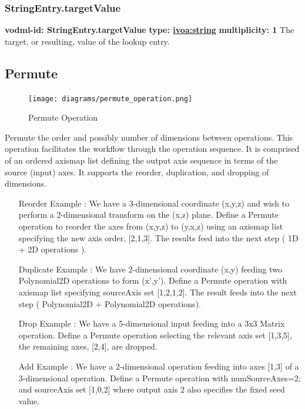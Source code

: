     \subsubsection{StringEntry.targetValue}
      \textbf{vodml-id: StringEntry.targetValue} \newline
      \textbf{type: \hyperref[sect:ivoa]{ivoa:string}} \newline
      \textbf{multiplicity: 1} \newline 
      The target, or resulting, value of the lookup entry.


  \subsection{Permute}
  \label{sect:Permute}
    \begin{figure}[h]
    \begin{center}
      \texttt{[image: diagrams/permute\_operation.png]}
      \caption{Permute Operation}\label{fig:PermuteOps}
    \end{center}
    \end{figure}
    Permute the order and possibly number of dimensions between operations. This operation facilitates the workflow through the operation sequence. It is comprised of an ordered axismap list defining the output axis sequence in terms of the source (input) axes. It supports the reorder, duplication, and dropping of dimensions. 
    \begin{itemize}
    \item[Reorder Example]: We have a 3-dimensional coordinate (x,y,z) and wish to perform a 2-dimensional transform on the (x,z) plane. Define a Permute operation to reorder the axes from (x,y,z) to (y,x,z) using an axismap list specifying the new axis order, [2,1,3]. The results feed into the next step ( 1D + 2D operations ). 
    \item[Duplicate Example]: We have 2-dimensional coordinate (x,y) feeding two Polynomial2D operations to form (x',y'). Define a Permute operation with axismap list specifying sourceAxis set [1,2,1,2]. The result feeds into the next step ( Polynomial2D + Polynomial2D operations). 
    \item[Drop Example]: We have a 5-dimensional input feeding into a 3x3 Matrix operation. Define a Permute operation selecting the relevant axis set [1,3,5], the remaining axes, [2,4], are dropped. 
    \item[Add Example]: We have a 2-dimensional operation feeding into axes [1,3] of a 3-dimensional operation. Define a Permute operation with numSourceAxes=2; and sourceAxis set [1,0,2] where output axis 2 also specifies the fixed seed value.
    \end{itemize}

